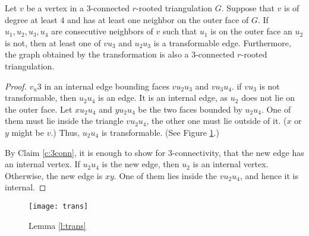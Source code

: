 \begin{lemma} \label{l:trans}
  Let $v$ be a vertex in a $3$-connected $r$-rooted triangulation $G$. Suppose that $v$ is of degree
  at least $4$ and has at least one neighbor on the outer face of $G$. If $u_1, u_2, u_3, u_4$
  are consecutive neighbors of $v$ such that $u_1$ is on the outer face an $u_2$
  is not, then at least one of $vu_3$ and $u_2u_3$ is a transformable edge. Furthermore,
  the graph obtained by the transformation is also a $3$-connected $r$-rooted triangulation.
\end{lemma}
\begin{proof}
  $v_u3$ in an internal edge bounding faces $vu_2u_3$ and $vu_3u_4$. if $vu_3$
  is not transformable, then $u_2u_4$ is an edge. It is an internal edge, as $u_2$
  does not lie on the outer face. Let $xu_2u_4$ and $yu_2u_4$
  be the two faces bounded by $u_2u_4$. One of them must lie inside the triangle $vu_2u_4$,
  the other one must lie outside of it. ($x$ or $y$ might be $v$.) Thus, $u_2u_4$
  is transformable. (See Figure \ref{fig:trans}.)

  By Claim \ref{c:3conn}, it is enough to show for $3$-connectivity, that the new
  edge has an internal vertex. If $u_2u_4$ is the new edge, then $u_2$ is an internal
  vertex. Otherwise, the new edge is $xy$. One of them lies inside the $vu_2u_4$,
  and hence it is internal.
\end{proof}

\begin{figure}[ht]
  \centering
  \texttt{[image: trans]}
  \caption{Lemma \ref{l:trans}}
  \label{fig:trans}
\end{figure}


